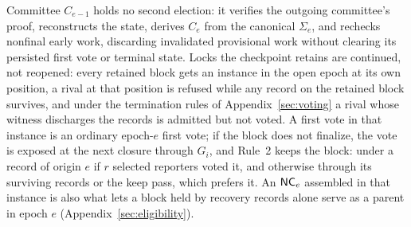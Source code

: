 Committee $C_{e-1}$ holds no second election: it verifies the outgoing committee's proof, reconstructs the state, derives $C_e$ from the canonical $\Sigma_e$, and rechecks nonfinal early work, discarding invalidated provisional work without clearing its persisted first vote or terminal state. Locks the checkpoint retains are continued, not reopened: every retained block gets an instance in the open epoch at its own position, a rival at that position is refused while any record on the retained block survives, and under the termination rules of Appendix~\ref{sec:voting} a rival whose witness discharges the records is admitted but not voted. A first vote in that instance is an ordinary epoch-$e$ first vote; if the block does not finalize, the vote is exposed at the next closure through $G_i$, and Rule~2 keeps the block: under a record of origin $e$ if $r$ selected reporters voted it, and otherwise through its surviving records or the keep pass, which prefers it. An $\mathsf{NC}_e$ assembled in that instance is also what lets a block held by recovery records alone serve as a parent in epoch $e$ (Appendix~\ref{sec:eligibility}).

